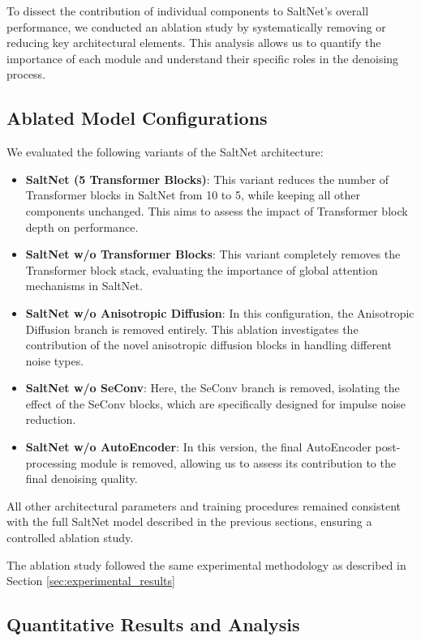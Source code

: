 To dissect the contribution of individual components to SaltNet's overall performance, we conducted an ablation study by systematically removing or reducing key architectural elements.  This analysis allows us to quantify the importance of each module and understand their specific roles in the denoising process.

\subsection{Ablated Model Configurations}

We evaluated the following variants of the SaltNet architecture:

\begin{itemize}
    \item \textbf{SaltNet (5 Transformer Blocks)}:  This variant reduces the number of Transformer blocks in SaltNet from 10 to 5, while keeping all other components unchanged. This aims to assess the impact of Transformer block depth on performance.
    \item \textbf{SaltNet w/o Transformer Blocks}:  This variant completely removes the Transformer block stack, evaluating the importance of global attention mechanisms in SaltNet.
    \item \textbf{SaltNet w/o Anisotropic Diffusion}: In this configuration, the Anisotropic Diffusion branch is removed entirely. This ablation investigates the contribution of the novel anisotropic diffusion blocks in handling different noise types.
    \item \textbf{SaltNet w/o SeConv}:  Here, the SeConv branch is removed, isolating the effect of the SeConv blocks, which are specifically designed for impulse noise reduction.
    \item \textbf{SaltNet w/o AutoEncoder}: In this version, the final AutoEncoder post-processing module is removed, allowing us to assess its contribution to the final denoising quality.
\end{itemize}

All other architectural parameters and training procedures remained consistent with the full SaltNet model described in the previous sections, ensuring a controlled ablation study.

The ablation study followed the same experimental methodology as described in Section \ref{sec:experimental_results}

\subsection{Quantitative Results and Analysis}

